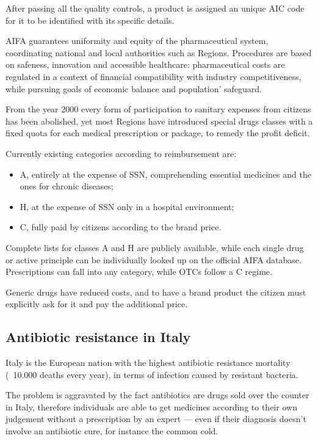 After passing all the quality controls, a product is assigned an unique AIC code for it to be identified with its specific details.

AIFA guarantees uniformity and equity of the pharmaceutical system, coordinating national and local authorities such as Regions. Procedures are based on safeness, innovation and accessible healthcare: pharmaceutical costs are regulated in a context of financial compatibility with industry competitiveness, while pursuing goals of economic balance and population' safeguard.

From the year 2000 every form of participation to sanitary expenses from citizens has been abolished\cite{ticket}, yet most Regions have introduced special drugs classes with a fixed quota for each medical prescription or package, to remedy the profit deficit. 

Currently existing categories according to reimbursement are\cite{classi}:
\begin{itemize}
	\item A, entirely at the expense of SSN, comprehending essential medicines and the ones for chronic diseases;
	\item H, at the expense of SSN only in a hospital environment;
	\item C, fully paid by citizens according to the brand price.
\end{itemize}
Complete lists for classes A and H are publicly available, while each single drug or active principle can be individually looked up on the official AIFA database. Prescriptions can fall into any category, while OTCs follow a C regime. 

Generic drugs have reduced costs, and to have a brand product the citizen must explicitly ask for it and pay the additional price\cite{ticket}.

\subsection{Antibiotic resistance in Italy}
Italy is the European nation with the highest antibiotic resistance mortality (~10.000 deaths every year), in terms of infection caused by resistant bacteria\cite{repubblica}. 

The problem is aggravated by the fact antibiotics are drugs sold over the counter in Italy, therefore individuals are able to get medicines according to their own judgement without a prescription by an expert --- even if their diagnosis doesn't involve an antibiotic cure, for instance the common cold. 

